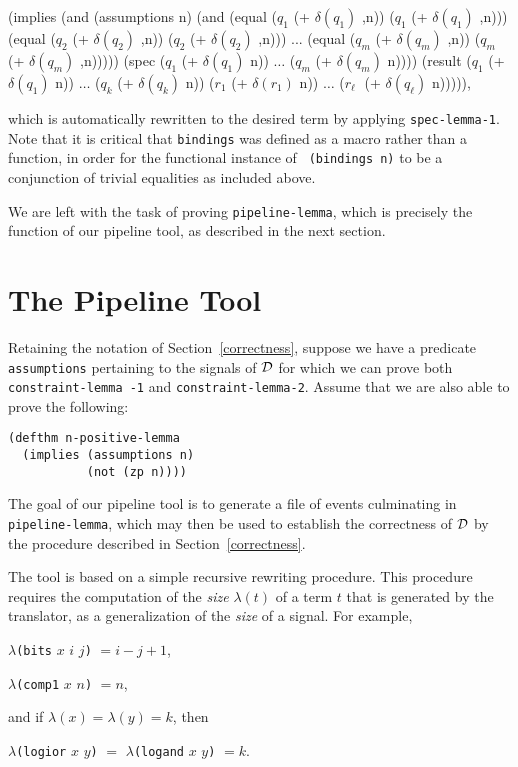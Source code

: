 \documentclass{article}
\begin{document}
\begin{acl2}
(implies (and (assumptions n)
              (and (equal ($q_1$ (+ $\delta(q_1)$ ,n)) ($q_1$ (+ $\delta(q_1)$ ,n)))
                   (equal ($q_2$ (+ $\delta(q_2)$ ,n)) ($q_2$ (+ $\delta(q_2)$ ,n)))
                   ...
                   (equal ($q_{m}$ (+ $\delta(q_{m})$ ,n)) ($q_{m}$ (+ $\delta(q_{m})$ ,n)))))
              (spec ($q_1$ (+ $\delta(q_1)$ n)) $\ldots$ ($q_m$ (+ $\delta(q_m)$ n))))
         (result ($q_1$ (+ $\delta(q_1)$ n)) $\ldots$ ($q_k$ (+ $\delta(q_k)$ n))
                 ($r_1$ (+ $\delta(r_1)$ n)) $\ldots$ ($r_\ell\;$ (+ $\delta(q_\ell)$ n))))),
\end{acl2}\noindent
which is automatically rewritten to the desired term by applying {\tt spec-lemma-1}.
Note that it is critical that {\tt bindings} was defined as a macro
rather than a function, in order for the functional instance of {\tt
(bindings n)} to be a conjunction of trivial equalities as included
above.

We are left with the task of proving {\tt pipeline-lemma}, which is
precisely the function of our pipeline tool, as described in the next
section.


\section{The Pipeline Tool}\label{pipeline-tool}

Retaining the notation of Section~\ref{correctness}, suppose we have a
predicate {\tt assumptions} pertaining to the signals of ${\cal D}$
for which we can prove both {\tt constraint-}{\tt lemma}{\tt
-1} and {\tt constraint-}{\tt lemma-2}.  Assume that we are also able
to prove the following:

\begin{verbatim}
(defthm n-positive-lemma
  (implies (assumptions n)
           (not (zp n))))
\end{verbatim}
The goal of our pipeline tool is to generate a file of events
culminating in {\tt pipeline-}{\tt lemma}, which may then be used to
establish the correctness of ${\cal D}$ by the procedure described in
Section~\ref{correctness}.

The tool is based on a simple recursive rewriting procedure.  This
procedure requires the computation of the {\it size} $\lambda(t)$ of a
term $t$ that is generated by the translator, as a generalization of
the {\it size} of a signal.  For example,
\begin{center}
$\lambda${\tt (bits} $x$ $i$ $j${\tt )} $= i-j+1$,
\end{center}
\begin{center}
$\lambda${\tt (comp1} $x$ $n${\tt )} $= n$,
\end{center}
and if $\lambda(x) = \lambda(y) = k$, then
\begin{center}
$\lambda${\tt (logior} $x$ $y${\tt )} $=$ $\lambda${\tt (logand} $x$ $y${\tt )} $= k$.
\end{center}
\end{document}
